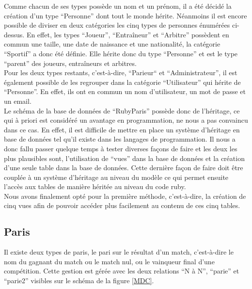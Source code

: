 \documentclass[10pt,a4paper,titlepage]{article}
\begin{document}
Comme chacun de ses types possède un nom et un prénom, il a été décidé la création d'un type “Personne” dont tout le monde hérite. Néanmoins il est encore possible de diviser en deux catégories les cinq types de personnes énumérées ci-dessus. En effet, les types “Joueur”, “Entraîneur” et “Arbitre” possèdent en commun une taille, une date de naissance et une nationalité, la catégorie “Sportif” a donc été définie. Elle hérite donc du type “Personne” et est le type “parent” des joueurs, entraîneurs et arbitres.\\

Pour les deux types restants, c'est-à-dire, “Parieur“ et “Administrateur”, il est également possible de les regrouper dans la catégorie “Utilisateur” qui hérite de “Personne”. En effet, ils ont en commun un nom d'utilisateur, un mot de passe et un email.\\

Le schéma de la base de données de “RubyParis” possède donc de l'héritage, ce qui à priori est considéré un avantage en programmation, ne nous a pas convaincu dans ce cas. En effet, il est difficile de mettre en place un système d'héritage en base de données tel qu'il existe dans les langages de programmation. Il nous a donc fallu passer quelque temps à tester diverses façons de faire et les deux les plus plausibles sont, l'utilisation de “vues” dans la base de données et la création d'une seule table dans la base de données. Cette dernière façon de faire doit être couplée à un système d'héritage au niveau du modèle ce qui permet ensuite l'accès aux tables de manière héritée au niveau du code ruby.\\

Nous avons finalement opté pour la première méthode, c'est-à-dire, la création de cinq vues afin de pouvoir accéder plus facilement au contenu de ces cinq tables.

\subsection{Paris}
Il existe deux types de paris, le pari sur le résultat d'un match, c'est-à-dire le nom du gagnant du match ou le match nul, ou le vainqueur final d'une compétition. Cette gestion est gérée avec les deux relations “N à N”, “parie” et “parie2” visibles sur le schéma de la figure \ref{MDC}.\\
\end{document}
